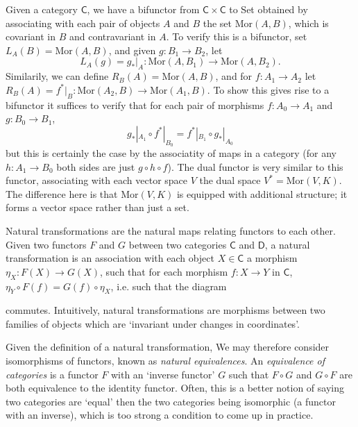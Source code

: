 \begin{example}
    Given a category $\mathsf{C}$, we have a bifunctor from $\mathsf{C} \times \mathsf{C}$ to {\sf Set} obtained by associating with each pair of objects $A$ and $B$ the set $\text{Mor}(A,B)$, which is covariant in $B$ and contravariant in $A$. To verify this is a bifunctor, set $L_A(B) = \text{Mor}(A,B)$, and given $g: B_1 \to B_2$, let
    \[ L_A(g) = g_*|_A: \text{Mor}(A,B_1) \to \text{Mor}(A,B_2). \]
    Similarily, we can define $R_B(A) = \text{Mor}(A,B)$, and for $f: A_1 \to A_2$ let $R_B(A) = f^*|_B : \text{Mor}(A_2,B) \to \text{Mor}(A_1,B)$. To show this gives rise to a bifunctor it suffices to verify that for each pair of morphisms $f: A_0 \to A_1$ and $g: B_0 \to B_1$,
    \[ g_*|_{A_1} \circ f^*|_{B_0} = f^*|_{B_1} \circ g_*|_{A_0} \]
    but this is certainly the case by the associatity of maps in a category (for any $h: A_1 \to B_0$ both sides are just $g \circ h \circ f$). The dual functor is very similar to this functor, associating with each vector space $V$ the dual space $V^* = \text{Mor}(V,K)$. The difference here is that $\text{Mor}(V,K)$ is equipped with additional structure; it forms a vector space rather than just a set.
\end{example}

Natural transformations are the natural maps relating functors to each other. Given two functors $F$ and $G$ between two categories $\mathsf{C}$ and $\mathsf{D}$, a natural transformation is an association with each object $X \in \mathsf{C}$ a morphism $\eta_X: F(X) \to G(X)$, such that for each morphism $f: X \to Y$ in $\mathsf{C}$, $\eta_Y \circ F(f) = G(f) \circ \eta_X$, i.e. such that the diagram
%
\begin{center}
\end{center}
%
commutes. Intuitively, natural transformations are morphisms between two families of objects which are `invariant under changes in coordinates'.

Given the definition of a natural transformation, We may therefore consider isomorphisms of functors, known as \emph{natural equivalences}. An \emph{equivalence of categories} is a functor $F$ with an `inverse functor' $G$ such that $F \circ G$ and $G \circ F$ are both equivalence to the identity functor. Often, this is a better notion of saying two categories are `equal' then the two categories being isomorphic (a functor with an inverse), which is too strong a condition to come up in practice.

